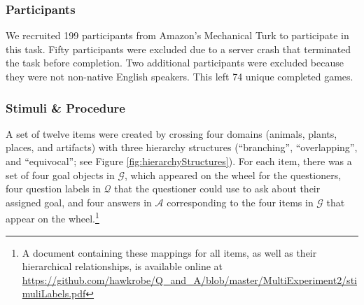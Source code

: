 \documentclass[12pt, floatsintext, jou]{apa6}
\begin{document}
\subsubsection{Participants} We recruited 199 participants
from Amazon's Mechanical Turk to participate in this task. Fifty participants were excluded due to a server crash that terminated the task before completion. Two additional participants were excluded because they were not non-native English speakers. This left 74 unique completed games.


\subsubsection{Stimuli \& Procedure} A set of twelve items were created by crossing four domains (animals, plants, places, and artifacts) with three hierarchy structures (``branching'', ``overlapping'', and ``equivocal''; see Figure \ref{fig:hierarchyStructures}). For each item, there was a set of four goal objects in $\mathcal{G}$, which appeared on the wheel for the questioners, four question labels in $\mathcal{Q}$ that the questioner could use to ask about their assigned goal, and four answers in $\mathcal{A}$ corresponding to the four items in $\mathcal{G}$ that appear on the wheel.\footnote{A document containing these mappings for all items, as well as their hierarchical relationships, is available online at \url{https://github.com/hawkrobe/Q\_and\_A/blob/master/MultiExperiment2/stimuliLabels.pdf}} 
\end{document}
